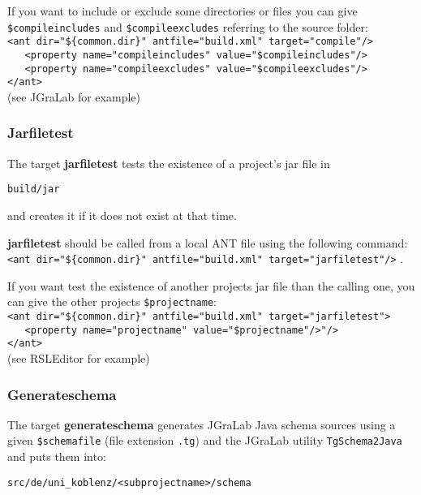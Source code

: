 \documentclass
[
		a4paper,
		twoside, 										
		BCOR10mm,											
		11pt,												
		halfparskip,								
		bigheadings,								
		notitlepage,			
		pdftex											
]
{scrartcl}
\begin{document}
If you want to include or exclude some directories or files you can give \texttt{\$compileincludes} and \texttt{\$compileexcludes} referring to the source folder:\\
\footnotesize
\verb|<ant dir="${common.dir}" antfile="build.xml" target="compile"/>|\\ \verb|   <property name="compileincludes" value="$compileincludes"/>|\\ \verb|   <property name="compileexcludes" value="$compileexcludes"/>|\\ \verb|</ant>|
\normalsize\\
(see JGraLab for example)


\subsubsection{Jarfiletest}
\label{Jarfiletest}

The target \textbf{jarfiletest} tests the existence of a project's jar file in
\footnotesize
\begin{compactitem}
	\item \texttt{build/jar}
\end{compactitem}
\normalsize
and creates it if it does not exist at that time.

\textbf{jarfiletest} should be called from a local ANT file using the following command: 
\footnotesize
\verb|<ant dir="${common.dir}" antfile="build.xml" target="jarfiletest"/>|
\normalsize.

If you want test the existence of another projects jar file than the calling one, you can give the other projects \texttt{\$projectname}:\\
\footnotesize
\verb|<ant dir="${common.dir}" antfile="build.xml" target="jarfiletest">|\\ \verb|   <property name="projectname" value="$projectname"/>"/>|\\ \verb|</ant>|
\normalsize\\
(see RSLEditor for example)


\subsubsection{Generateschema}
\label{Generateschema}

The target \textbf{generateschema} generates JGraLab Java schema sources using a given \texttt{\$schemafile} (file extension \texttt{.tg}) and the JGraLab utility \texttt{TgSchema2Java} and puts them into:
\footnotesize
\begin{compactitem}
	\item \texttt{src/de/uni\_koblenz/<subprojectname>/schema}
\end{compactitem}
\normalsize
\end{document}
